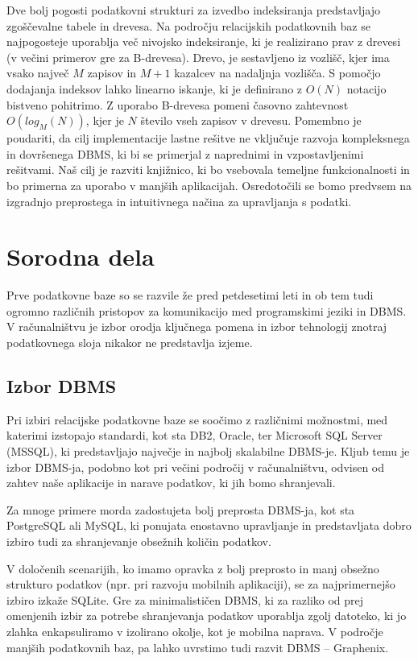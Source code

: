 \documentclass[a4paper,12pt,openright]{book}
\begin{document}
    Dve bolj pogosti podatkovni strukturi za izvedbo indeksiranja predstavljajo zgoščevalne tabele in drevesa. Na področju relacijskih podatkovnih baz se najpogosteje uporablja več nivojsko indeksiranje, ki je realizirano prav z drevesi (v večini primerov gre za B-drevesa). Drevo, je sestavljeno iz vozlišč, kjer ima vsako največ $M$ zapisov in $M+1$ kazalcev na nadaljnja vozlišča. S pomočjo dodajanja indeksov lahko linearno iskanje, ki je definirano z $O(N)$ notacijo bistveno pohitrimo. Z uporabo B-drevesa pomeni časovno zahtevnost $O(log_M(N))$, kjer je $N$ število vseh zapisov v drevesu.
    \newline
    \newline
    \noindent
    Pomembno je poudariti, da cilj implementacije lastne rešitve ne vključuje razvoja kompleksnega in dovršenega DBMS, ki bi se primerjal z naprednimi in vzpostavljenimi rešitvami. Naš cilj je razviti knjižnico, ki bo vsebovala temeljne funkcionalnosti in bo primerna za uporabo v manjših aplikacijah. Osredotočili se bomo predvsem na izgradnjo preprostega in intuitivnega načina za upravljanja s podatki.

\chapter{Sorodna dela}

    Prve podatkovne baze so se razvile že pred petdesetimi leti in ob tem tudi ogromno različnih pristopov za komunikacijo med programskimi jeziki in DBMS. V računalništvu je izbor orodja ključnega pomena in izbor tehnologij znotraj podatkovnega sloja nikakor ne predstavlja izjeme.

    \section{Izbor DBMS}
    Pri izbiri relacijske podatkovne baze se soočimo z različnimi možnostmi, med katerimi izstopajo standardi, kot sta DB2, Oracle, ter Microsoft SQL Server (MSSQL), ki predstavljajo največje in najbolj skalabilne DBMS-je. Kljub temu je izbor DBMS-ja, podobno kot pri večini področij v računalništvu, odvisen od zahtev naše aplikacije in narave podatkov, ki jih bomo shranjevali.

    Za mnoge primere morda zadostujeta bolj preprosta DBMS-ja, kot sta PostgreSQL ali MySQL, ki ponujata enostavno upravljanje in predstavljata dobro izbiro tudi za shranjevanje obsežnih količin podatkov. 
    
    V določenih scenarijih, ko imamo opravka z bolj preprosto in manj obsežno strukturo podatkov (npr. pri razvoju mobilnih aplikaciji), se za najprimernejšo izbiro izkaže SQLite. Gre za minimalističen DBMS, ki za razliko od prej omenjenih izbir za potrebe shranjevanja podatkov uporablja zgolj datoteko, ki jo zlahka enkapsuliramo v izolirano okolje, kot je mobilna naprava. V področje manjših podatkovnih baz, pa lahko uvrstimo tudi razvit DBMS – Graphenix\cite{GRAPHENIX_GITHUB}.
    
\end{document}
